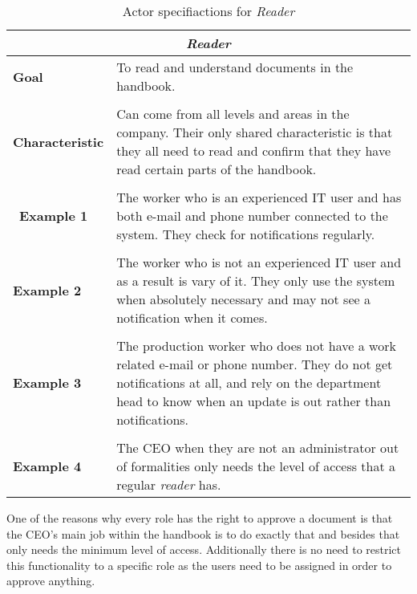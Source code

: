 \begin{table}[H]
	\begin{tabular}{l p{11.3cm}}
		\hline
		\multicolumn{2}{c}{\textbf{\textit{Reader}}}\\
		\hline
		
		\textbf{Goal} & To read and understand documents in the handbook. \\
		&  \\
		
		\textbf{Characteristic} & Can come from all levels and areas in the company.
		Their only shared characteristic is that they all need to read and confirm that they have read certain parts of the handbook.\\
		&  \\
		\
		\textbf{Example 1}
		& The worker who is an experienced IT user and has both e-mail and phone number connected to the system.
		They check for notifications regularly.\\
		&  \\
		
		\textbf{Example 2}
		& The worker who is not an experienced IT user and as a result is vary of it. 
		They only use the system when absolutely necessary and may not see a notification when it comes.\\
		
		&  \\
		\textbf{Example 3}
		& The production worker who does not have a work related e-mail or phone number. 
		They do not get notifications at all, and rely on the department head to know when an update is out rather than notifications.\\
		&  \\
		
		\textbf{Example 4}
		& The CEO when they are not an administrator out of formalities only needs the level of access that a regular \textit{reader} has.\\		
		
		\hline
	\end{tabular}
	\caption{Actor specifiactions for \textit{Reader}}\label{tab:Actor-reader}
\end{table}

One of the reasons why every role has the right to approve a document is that the CEO's main job within the handbook is to do exactly that and besides that only needs the minimum level of access.
Additionally there is no need to restrict this functionality to a specific role as the users need to be assigned in order to approve anything.